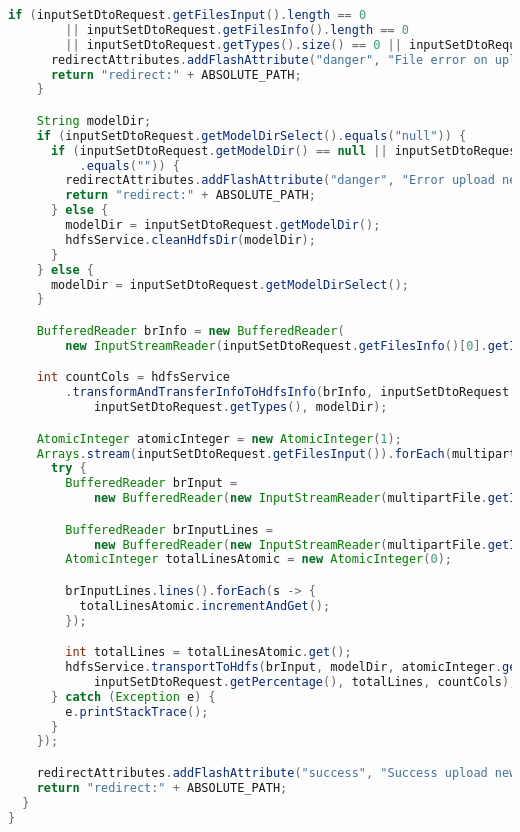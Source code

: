 \begin{lstlisting}[language=Java,basicstyle=\tiny,caption=InputController.java]
    if (inputSetDtoRequest.getFilesInput().length == 0
        || inputSetDtoRequest.getFilesInfo().length == 0
        || inputSetDtoRequest.getTypes().size() == 0 || inputSetDtoRequest.getClazz().size() == 0) {
      redirectAttributes.addFlashAttribute("danger", "File error on upload files");
      return "redirect:" + ABSOLUTE_PATH;
    }

    String modelDir;
    if (inputSetDtoRequest.getModelDirSelect().equals("null")) {
      if (inputSetDtoRequest.getModelDir() == null || inputSetDtoRequest.getModelDir().trim()
          .equals("")) {
        redirectAttributes.addFlashAttribute("danger", "Error upload new file");
        return "redirect:" + ABSOLUTE_PATH;
      } else {
        modelDir = inputSetDtoRequest.getModelDir();
        hdfsService.cleanHdfsDir(modelDir);
      }
    } else {
      modelDir = inputSetDtoRequest.getModelDirSelect();
    }

    BufferedReader brInfo = new BufferedReader(
        new InputStreamReader(inputSetDtoRequest.getFilesInfo()[0].getInputStream()));

    int countCols = hdfsService
        .transformAndTransferInfoToHdfsInfo(brInfo, inputSetDtoRequest.getClazz(),
            inputSetDtoRequest.getTypes(), modelDir);

    AtomicInteger atomicInteger = new AtomicInteger(1);
    Arrays.stream(inputSetDtoRequest.getFilesInput()).forEach(multipartFile -> {
      try {
        BufferedReader brInput =
            new BufferedReader(new InputStreamReader(multipartFile.getInputStream()));

        BufferedReader brInputLines =
            new BufferedReader(new InputStreamReader(multipartFile.getInputStream()));
        AtomicInteger totalLinesAtomic = new AtomicInteger(0);

        brInputLines.lines().forEach(s -> {
          totalLinesAtomic.incrementAndGet();
        });

        int totalLines = totalLinesAtomic.get();
        hdfsService.transportToHdfs(brInput, modelDir, atomicInteger.getAndIncrement(),
            inputSetDtoRequest.getPercentage(), totalLines, countCols);
      } catch (Exception e) {
        e.printStackTrace();
      }
    });

    redirectAttributes.addFlashAttribute("success", "Success upload new file to HDFS");
    return "redirect:" + ABSOLUTE_PATH;
  }
}

\end{lstlisting}


